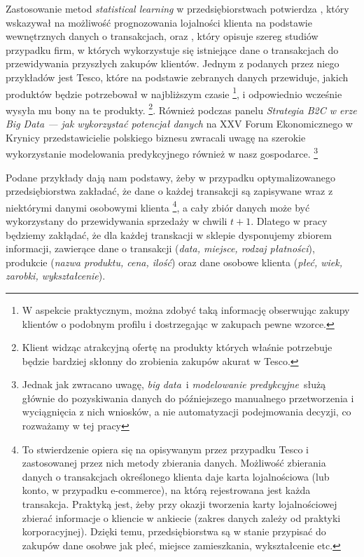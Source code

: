 \documentclass[polish, twoside, 12pt, a4paper]{article}
\theoremstyle{definition}
\theoremstyle{plain}
\theoremstyle{remark}
\begin{document}
Zastosowanie metod \textit{statistical learning} w przedsiębiorstwach potwierdza \cite{Buckinx2007}, który wskazywał na możliwość prognozowania lojalności klienta na podstawie wewnętrznych danych o transakcjach, oraz \cite{Davenport2011}, który opisuje szereg studiów przypadku firm, w których wykorzystuje się istniejące dane o transakcjach do przewidywania przyszłych zakupów klientów. Jednym z podanych przez niego przykładów jest Tesco, które na podstawie zebranych danych przewiduje, jakich produktów będzie potrzebował w najbliższym czasie \footnote{W aspekcie praktycznym, można zdobyć taką informację obserwując zakupy klientów o podobnym profilu i dostrzegając w zakupach pewne wzorce.}, i odpowiednio wcześnie wysyła mu bony na te produkty. \footnote{Klient widząc atrakcyjną ofertę na produkty których właśnie potrzebuje będzie bardziej skłonny do zrobienia zakupów akurat w Tesco.}. Również podczas panelu \textit{Strategia B2C w erze Big Data --- jak wykorzystać potencjał danych} na XXV Forum Ekonomicznego w Krynicy przedstawicielie polskiego biznesu zwracali uwagę na szerokie wykorzystanie modelowania predykcyjnego również w nasz gospodarce. \footnote{Jednak jak zwracano uwagę, \textit{big data}\ i \textit{modelowanie predykcyjne}\ służą głównie do pozyskiwania danych do późniejszego manualnego przetworzenia i wyciągnięcia z nich wniosków, a nie automatyzacji podejmowania decyzji, co rozważamy w tej pracy}

Podane przykłady dają nam podstawy, żeby w przypadku optymalizowanego przedsiębiorstwa zakładać, że dane o każdej transakcji są zapisywane wraz z niektórymi danymi osobowymi klienta \footnote{To stwierdzenie opiera się na opisywanym przez \cite{Davenport2011} przypadku Tesco i zastosowanej przez nich metody zbierania danych. Możliwość zbierania danych o transakcjach określonego klienta daje karta lojalnościowa (lub konto, w przypadku e-commerce), na którą rejestrowana jest każda transakcja. Praktyką jest, żeby przy okazji tworzenia karty lojalnościowej zbierać informacje o kliencie w ankiecie (zakres danych zależy od praktyki korporacyjnej). Dzięki temu, przedsiębiorstwa są w stanie przypisać do zakupów dane osobwe jak płeć, miejsce zamieszkania, wykształcenie etc.}, a cały zbiór danych może być wykorzystany do przewidywania sprzedaży w chwili $t + 1$. Dlatego w pracy będziemy zakłądać, że dla każdej transkacji w sklepie dysponujemy zbiorem informacji, zawierące dane o transakcji (\textit{data, miejsce, rodzaj płatności}), produkcie (\textit{nazwa produktu, cena, ilość}) oraz dane osobowe klienta (\textit{płeć, wiek, zarobki, wykształcenie}).
\end{document}
